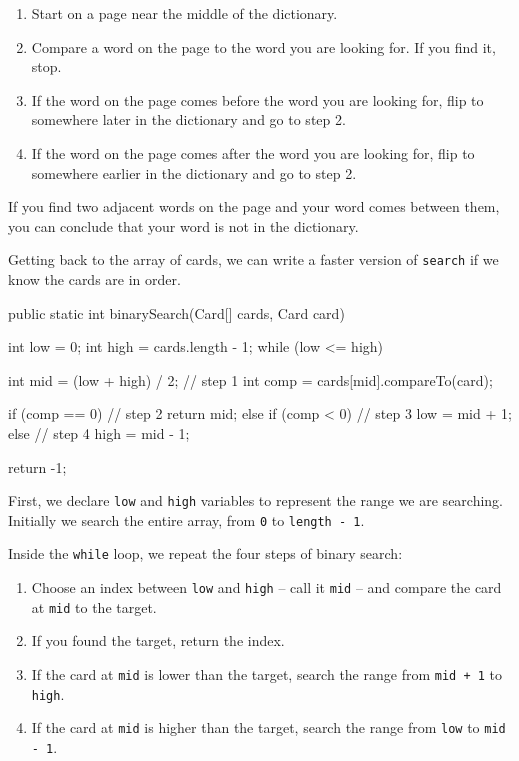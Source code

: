 \documentclass[12pt]{book}
\theoremstyle{exercise}
\newcommand{\java}[1]{\verb"#1"}
\begin{document}
\begin{enumerate}

\item Start on a page near the middle of the dictionary.

\item Compare a word on the page to the word you are looking for.
If you find it, stop.

\item If the word on the page comes before the word you are looking for, flip to somewhere later in the dictionary and go to step 2.

\item If the word on the page comes after the word you are looking for, flip to somewhere earlier in the dictionary and go to step 2.

\end{enumerate}

If you find two adjacent words on the page and your word comes between them, you can conclude that your word is not in the dictionary.

Getting back to the array of cards, we can write a faster version of \java{search} if we know the cards are in order.

\begin{code}
public static int binarySearch(Card[] cards, Card card) {
    int low = 0;
    int high = cards.length - 1;
    while (low <= high) {
        int mid = (low + high) / 2;                   // step 1
        int comp = cards[mid].compareTo(card);

        if (comp == 0) {                              // step 2
            return mid;
        } else if (comp < 0) {                        // step 3
            low = mid + 1;
        } else {                                      // step 4
            high = mid - 1;
        }
    }
    return -1;
}
\end{code}

First, we declare \java{low} and \java{high} variables to represent the range we are searching.
Initially we search the entire array, from \java{0} to \java{length - 1}.

Inside the \java{while} loop, we repeat the four steps of binary search:

\begin{enumerate}

\item Choose an index between \java{low} and \java{high}  --  call it \java{mid}  --  and compare the card at \java{mid} to the target.

\item If you found the target, return the index.

\item If the card at \java{mid} is lower than the target, search the range from \java{mid + 1} to \java{high}.

\item If the card at \java{mid} is higher than the target, search the range from \java{low} to \java{mid - 1}.

\end{enumerate}
\end{document}
